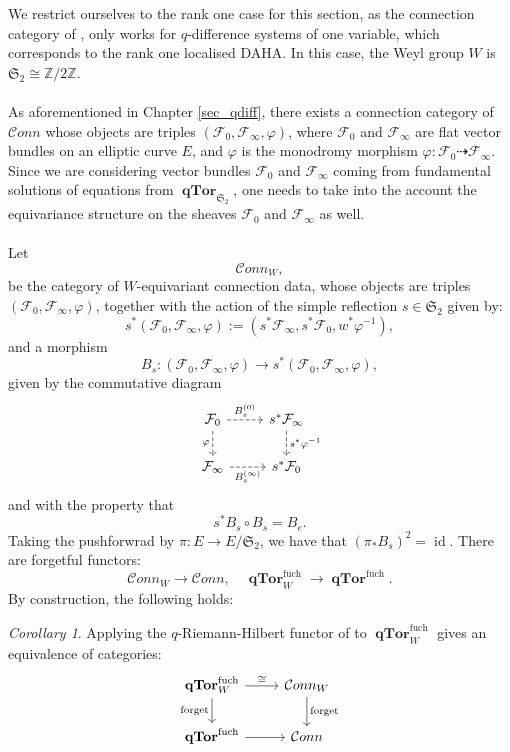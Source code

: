 \documentclass[a4paper]{report}
\theoremstyle{theorem}
\theoremstyle{definition}
\theoremstyle{remark}
\theoremstyle{proposition}
\theoremstyle{conjecture}
\theoremstyle{lemma}
\theoremstyle{corollary}
\newtheorem{corollary}{Corollary}
\theoremstyle{exercise}
\theoremstyle{example}
\newcommand{\mcal}{\mathcal}
\newcommand{\on}{\operatorname}
\newcommand{\qTor}{\on{\mathbf{qTor}}}
\begin{document}
  We restrict ourselves to the rank one case for this section, as the connection category of \cite{sauloy03}, 
  only works for $q$-difference systems of one variable, which corresponds to the rank one localised DAHA. 
  In this case, the Weyl group $W$ is $\mathfrak{S}_2 \cong \mathbb{Z}/2\mathbb{Z}$.\\\\
  As aforementioned in Chapter \ref{sec_qdiff}, there exists a connection category 
  of $\mcal{C}onn$ whose objects are triples $(\mcal{F}_0,\mcal{F}_\infty,\varphi)$,
  where $\mcal{F}_0$ and $\mcal{F}_\infty$ are flat vector bundles on an elliptic curve 
  $E$, and $\varphi$ is the monodromy morphism $\varphi : \mcal{F}_0 \dashrightarrow \mcal{F}_\infty$.
  Since we are considering vector bundles $\mcal{F}_0$ and $\mcal{F}_\infty$ coming from 
  fundamental solutions of equations from $\qTor_{\mathfrak{S}_2}$, one needs to take into the account
  the equivariance structure on the sheaves $\mcal{F}_0$ and $\mcal{F}_\infty$ as well.\\\\
  Let $$\mcal{C}onn_W,$$ be the category of $W$-equivariant connection data,
  whose objects are triples $(\mcal{F}_0,\mcal{F}_\infty,\varphi)$, together with the action of the simple reflection $s \in \mathfrak{S}_2$ given by:
  $$s^\ast (\mcal{F}_0,\mcal{F}_\infty, \varphi) := (s^\ast\mcal{F}_\infty, s^\ast\mcal{F}_0, w^\ast\varphi^{-1}),$$
  and a morphism
  $$B_s : (\mcal{F}_0,\mcal{F}_\infty,\varphi) \longrightarrow s^\ast (\mcal{F}_0,\mcal{F}_\infty,\varphi),$$
  given by the commutative diagram
  \begin{equation}\label{eqn_conn_comm}
      \begin{tikzcd}
          \mcal{F}_0 \arrow[d, "\varphi"', dashed] \arrow[r, "B_s^{(0)}", dashed] & s^\ast\mcal{F}_\infty \arrow[d, "s^\ast\varphi^{-1}", dashed] \\
          \mcal{F}_\infty \arrow[r, "B_s^{(\infty)}"', dashed]                         & s^\ast\mcal{F}_0                                             
      \end{tikzcd}
  \end{equation}
  and with the property that $$s^\ast B_s \circ B_s = B_{e}.$$
  Taking the pushforwrad by $\pi : E \to E/\mathfrak{S}_2$, we have that 
  $\left(\pi_\ast B_s\right)^2 = \on{id}$.
  There are forgetful functors:
  $$\mcal{C}onn_W \longrightarrow \mcal{C}onn, \quad \qTor^{\on{fuch}}_W \longrightarrow \qTor^{\on{fuch}}.$$
  By construction, the following holds:
  \begin{corollary}
      Applying the $q$-Riemann-Hilbert functor of \cite{sauloy03} to 
      $\qTor_W^{\on{fuch}}$ gives an equivalence of categories:
      $$\begin{tikzcd}
          \qTor^{\on{fuch}}_W \arrow[r, "\cong"] \arrow[d, "\on{forget}"'] & \mcal{C}onn_W \arrow[d, "\on{forget}"] \\
          \qTor^{\on{fuch}} \arrow[r]                                      & \mcal{C}onn                           
      \end{tikzcd}$$
  \end{corollary}
  
\end{document}
